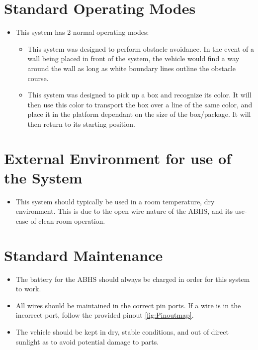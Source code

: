 \documentclass[11pt]{report}
\begin{document}
\section{Standard Operating Modes}
\begin{itemize}
\item This system has 2 normal operating modes:
    \begin{itemize}
        \item This system was designed to perform obstacle avoidance. In the event of a wall being placed in front of the system, the vehicle would find a way around the wall as long as white boundary lines outline the obstacle course.
        \item This system was designed to pick up a box and recognize its color. It will then use this color to transport the box over a line of the same color, and place it in the platform dependant on the size of the box/package. It will then return to its starting position.
\end{itemize}
\end{itemize}
\section {External Environment for use of the System}
\begin{itemize}
    \item This system should typically be used in a room temperature, dry environment. This is due to the open wire nature of the \gls{ABHS}, and its use-case of clean-room operation.
\end{itemize}
\section{Standard Maintenance}
\begin{itemize}
    \item The battery for the \gls{ABHS} should always be charged in order for this system to work.
    \item All wires should be maintained in the correct pin ports. If a wire is in the incorrect port, follow the provided pinout \cref{fig:Pinoutmap}.
    \item The vehicle should be kept in dry, stable conditions, and out of direct sunlight as to avoid potential damage to parts.
\end{itemize}
\end{document}
